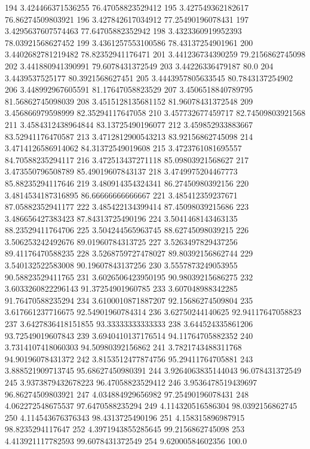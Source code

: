 {194 3.424466371536255 76.47058823529412
195 3.427549362182617 76.86274509803921
196 3.427842617034912 77.25490196078431
197 3.4295637607574463 77.64705882352942
198 3.4323360919952393 78.03921568627452
199 3.4361257553100586 78.43137254901961
200 3.4402682781219482 78.82352941176471
201 3.441236734390259 79.2156862745098
202 3.441880941390991 79.6078431372549
203 3.44226336479187 80.0
204 3.4439537525177 80.3921568627451
205 3.4443957805633545 80.7843137254902
206 3.448992967605591 81.17647058823529
207 3.4506518840789795 81.56862745098039
208 3.4515128135681152 81.96078431372548
209 3.456866979598999 82.35294117647058
210 3.457732677459717 82.74509803921568
211 3.4584312438964844 83.13725490196077
212 3.459852933883667 83.52941176470587
213 3.4712812900543213 83.92156862745098
214 3.4714126586914062 84.31372549019608
215 3.4723761081695557 84.70588235294117
216 3.472513437271118 85.09803921568627
217 3.473550796508789 85.49019607843137
218 3.4749975204467773 85.88235294117646
219 3.480914354324341 86.27450980392156
220 3.4814534187316895 86.66666666666667
221 3.485412359237671 87.05882352941177
222 3.485422134399414 87.45098039215686
223 3.486656427383423 87.84313725490196
224 3.5041468143463135 88.23529411764706
225 3.504244565963745 88.62745098039215
226 3.506253242492676 89.01960784313725
227 3.5263497829437256 89.41176470588235
228 3.5268759727478027 89.80392156862744
229 3.540132522583008 90.19607843137256
230 3.5557873249053955 90.58823529411765
231 3.6026506423950195 90.98039215686275
232 3.6033260822296143 91.37254901960785
233 3.607048988342285 91.76470588235294
234 3.6100010871887207 92.15686274509804
235 3.617661237716675 92.54901960784314
236 3.62750244140625 92.94117647058823
237 3.6427836418151855 93.33333333333333
238 3.644524335861206 93.72549019607843
239 3.6940410137176514 94.11764705882352
240 3.7314107418060303 94.50980392156862
241 3.7821743488311768 94.90196078431372
242 3.8153512477874756 95.29411764705881
243 3.888521909713745 95.68627450980391
244 3.9264063835144043 96.078431372549
245 3.9373879432678223 96.47058823529412
246 3.9536478519439697 96.86274509803921
247 4.034884929656982 97.25490196078431
248 4.062272548675537 97.6470588235294
249 4.114320516586304 98.0392156862745
250 4.114543676376343 98.4313725490196
251 4.158315896987915 98.8235294117647
252 4.3971943855285645 99.2156862745098
253 4.413921117782593 99.6078431372549
254 9.62000584602356 100.0
}\tableexpivecdfrlactcricriu
